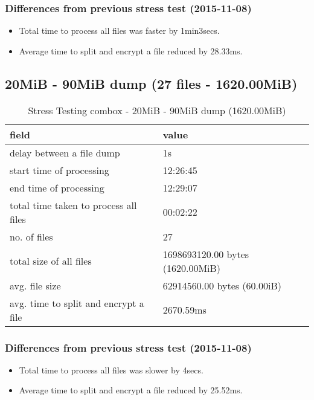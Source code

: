 \subsubsection{Differences from previous stress test (2015-11-08)}

\begin{itemize}
\item Total time to process all files was faster by 1min3secs.
\item Average time to split and encrypt a file reduced by 28.33ms.
\end{itemize}

\subsection{20MiB - 90MiB dump (27 files -
  1620.00MiB)}\label{4-st-1620}

\begin{center}
  \begin{table}[h]
    \begin{tabular}{ll}
      field & value\\
      \hline
      delay between a file dump & 1s\\
      start time of processing & 12:26:45\\
      end time of processing & 12:29:07\\
      total time taken to process all files & 00:02:22\\
      no. of files & 27\\
      total size of all files & 1698693120.00 bytes (1620.00MiB)\\
      avg. file size & 62914560.00 bytes (60.00iB)\\
      avg. time to split and encrypt a file & 2670.59ms\\
    \end{tabular}
    \caption{Stress Testing combox - 20MiB - 90MiB dump (1620.00MiB)}
  \end{table}
\end{center}

\subsubsection{Differences from previous stress test (2015-11-08)}

\begin{itemize}
\item Total time to process all files was slower by 4secs.
\item Average time to split and encrypt a file reduced by 25.52ms.
\end{itemize}

